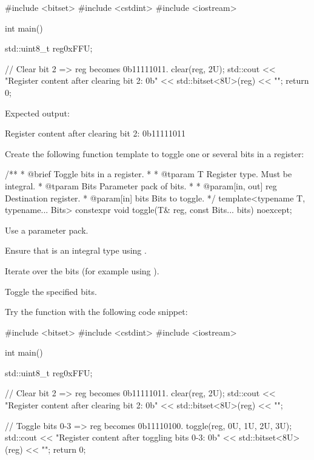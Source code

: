 \begin{cppcode}
#include <bitset>
#include <cstdint>
#include <iostream>

int main()
{
    std::uint8_t reg{0xFFU};

    // Clear bit 2 => reg becomes 0b11111011.
    clear(reg, 2U);
    std::cout << "Register content after clearing bit 2: 0b" << std::bitset<8U>(reg) << "\n";
    return 0;
}
\end{cppcode}

\noindent Expected output:

\begin{console}
Register content after clearing bit 2: 0b11111011
\end{console}

\label{c5:ex:1.2}
Create the following function template to toggle one or several bits in a register:

\begin{cppcode}
/**
 * @brief Toggle bits in a register.
 *
 * @tparam T Register type. Must be integral.
 * @tparam Bits Parameter pack of bits.
 *
 * @param[in, out] reg Destination register.
 * @param[in] bits Bits to toggle.
 */
template<typename T, typename... Bits>
constexpr void toggle(T& reg, const Bits... bits) noexcept;
\end{cppcode}

\begin{parts}
  \item Use a parameter pack.
  \item Ensure that  is an integral type using .
  \item Iterate over the bits (for example using ).
  \item Toggle the specified bits.
  \item Try the  function with the following code snippet:
\end{parts}

\begin{cppcode}
#include <bitset>
#include <cstdint>
#include <iostream>

int main()
{
    std::uint8_t reg{0xFFU};

    // Clear bit 2 => reg becomes 0b11111011.
    clear(reg, 2U);
    std::cout << "Register content after clearing bit 2: 0b" << std::bitset<8U>(reg) << "\n";

    // Toggle bits 0-3 => reg becomes 0b11110100.
    toggle(reg, 0U, 1U, 2U, 3U);
    std::cout << "Register content after toggling bits 0-3: 0b" << std::bitset<8U>(reg) << "\n";
    return 0;
}
\end{cppcode}

